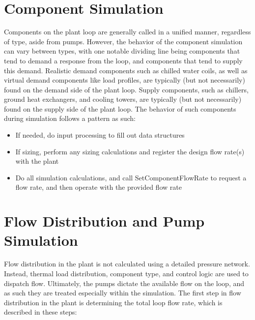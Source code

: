 \documentclass{report}
\begin{document}
        \section{Component Simulation}\label{sec:modeling-component}

            Components on the plant loop are generally called in a unified manner, regardless of type, aside from pumps.
            However, the behavior of the component simulation can vary between types, with one notable dividing line being components that tend to demand a response from the loop, and components that tend to supply this demand.
            Realistic demand components such as chilled water coils, as well as virtual demand components like load profiles, are typically (but not necessarily) found on the demand side of the plant loop.
            Supply components, such as chillers, ground heat exchangers, and cooling towers, are typically (but not necessarily) found on the supply side of the plant loop.
            The behavior of such components during simulation follows a pattern as such:

            \begin{itemize}
                \item If needed, do input processing to fill out data structures
                \item If sizing, perform any sizing calculations and register the design flow rate(s) with the plant
                \item Do all simulation calculations, and call SetComponentFlowRate to request a flow rate, and then operate with the provided flow rate
            \end{itemize}

        \section{Flow Distribution and Pump Simulation}\label{sec:modeling-flow}

            Flow distribution in the plant is not calculated using a detailed pressure network.
            Instead, thermal load distribution, component type, and control logic are used to dispatch flow.
            Ultimately, the pumps dictate the available flow on the loop, and as such they are treated especially within the simulation.
            The first step in flow distribution in the plant is determining the total loop flow rate, which is described in these steps:
\end{document}
